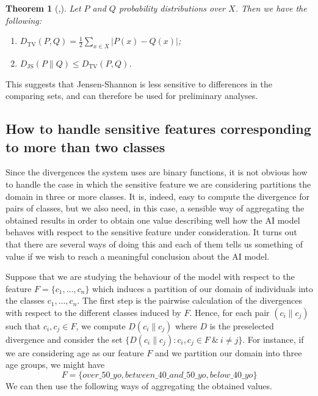 \documentclass[
]{ceurart}
\newtheorem*{theorem*}{Theorem}
\begin{document}
\begin{theorem*}[{\cite[Prop. 4.2]{levin2017markov}},{\cite[Thm. 3]{lin_divergence}}]
Let $P$ and $Q$ probability distributions over $X$. Then we have the following:
\begin{enumerate}
\item $D_{\mathrm{TV}}(P,Q)=\frac{1}{2}\sum_{x\in X}\vert P(x)-Q(x)\vert$;
\vspace{0.2cm}
\item $D_{\mathrm{JS}}(P\parallel Q)\leq D_\mathrm{TV}(P,Q)$.
\vspace{0.2cm}
\end{enumerate}
\end{theorem*}

This suggests that Jensen-Shannon is less sensitive to differences in the comparing sets, and can therefore be used for preliminary analyses.

\subsection{How to handle sensitive features corresponding to more than two classes}\label{subsec:aggregation}
Since the divergences the system uses are binary functions, it is not obvious how to handle the case in which the sensitive feature we are considering partitions the domain in three or more classes. It is, indeed, easy to compute the divergence for pairs of classes, but we also need, in this case, a sensible way of aggregating the obtained results in order to obtain one value describing well how the AI model behaves with respect to the sensitive feature under consideration. It turns out that there are several ways of doing this and each of them tells us something of value if we wish to reach a meaningful conclusion about the AI model.

Suppose that we are studying the behaviour of the model with respect to the feature $F=\{c_1, \ldots , c_n\}$ which induces a partition of our domain of individuals into the classes $c_1, \ldots , c_n$. The first step is the pairwise calculation of the divergences with respect to the different classes induced by $F$. Hence, for each pair $(c_i\parallel c_j)$ such that $c_i, c_j\in F$, we compute $D(c_i\parallel c_j) $ where $D$ is the  preselected divergence and consider the set $\{D(c_i\parallel c_j) : c_i,c_j\in F\ \&\ i\neq j\}$. For instance, if we are considering age as our feature  $F$ and we partition our domain into three age groups, we might have
\[F=\{over\_50\_yo, between\_40\_and\_50\_yo, below\_40\_yo\}\]
We can then use the following ways of aggregating the obtained values.
\end{document}
